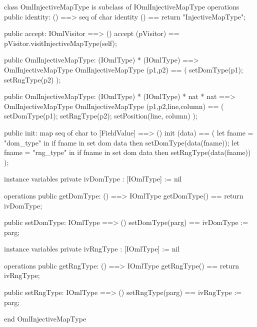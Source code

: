 \begin{vdm_al}
class OmlInjectiveMapType is subclass of IOmlInjectiveMapType
operations
  public identity: () ==> seq of char
  identity () == return "InjectiveMapType";

  public accept: IOmlVisitor ==> ()
  accept (pVisitor) == pVisitor.visitInjectiveMapType(self);

  public OmlInjectiveMapType:
    (IOmlType) *
    (IOmlType) ==> OmlInjectiveMapType
  OmlInjectiveMapType (p1,p2) == 
    ( setDomType(p1);
      setRngType(p2) );

  public OmlInjectiveMapType:
    (IOmlType) *
    (IOmlType) *
    nat *
    nat ==> OmlInjectiveMapType
  OmlInjectiveMapType (p1,p2,line,column) == 
    ( setDomType(p1);
      setRngType(p2);
      setPosition(line, column) );

  public init: map seq of char to [FieldValue] ==> ()
  init (data) ==
    ( let fname = "dom_type" in
        if fname in set dom data
        then setDomType(data(fname));
      let fname = "rng_type" in
        if fname in set dom data
        then setRngType(data(fname)) );

instance variables
  private ivDomType : [IOmlType] := nil

operations
  public getDomType: () ==> IOmlType
  getDomType() == return ivDomType;

  public setDomType: IOmlType ==> ()
  setDomType(parg) == ivDomType := parg;

instance variables
  private ivRngType : [IOmlType] := nil

operations
  public getRngType: () ==> IOmlType
  getRngType() == return ivRngType;

  public setRngType: IOmlType ==> ()
  setRngType(parg) == ivRngType := parg;

end OmlInjectiveMapType
\end{vdm_al}

